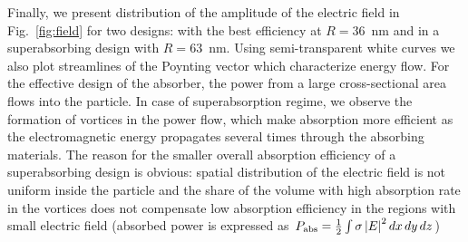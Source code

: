 \documentclass[aps,prl,twocolumn,showpacs,superscriptaddress,groupedaddress]{revtex4-1}  %
\begin{document}
\begin{figure}
\end{figure}
Finally, we present distribution of the amplitude of the electric
field in Fig.~\ref{fig:field} for two designs: with the best
efficiency at $R=36$~nm and in a superabsorbing design with $R=63$~nm.
Using semi-transparent white curves we also plot streamlines of the
Poynting vector which characterize energy flow.  For the effective
design of the absorber, the power from a large cross-sectional area
flows into the particle.  In case of superabsorption regime, we
observe the formation of vortices in the power flow, which make
absorption more efficient as the electromagnetic energy propagates
several times through the absorbing materials.  The reason for the
smaller overall absorption efficiency of a superabsorbing design is
obvious: spatial distribution of the electric field is not uniform
inside the particle and the share of the volume with high absorption
rate in the vortices does not compensate low absorption efficiency in
the regions with small electric field (absorbed power is expressed as
$P_{\rm abs}=\frac{1}{2}\int\sigma \left|E\right|^2dx\,dy\,dz$)
\end{document}
